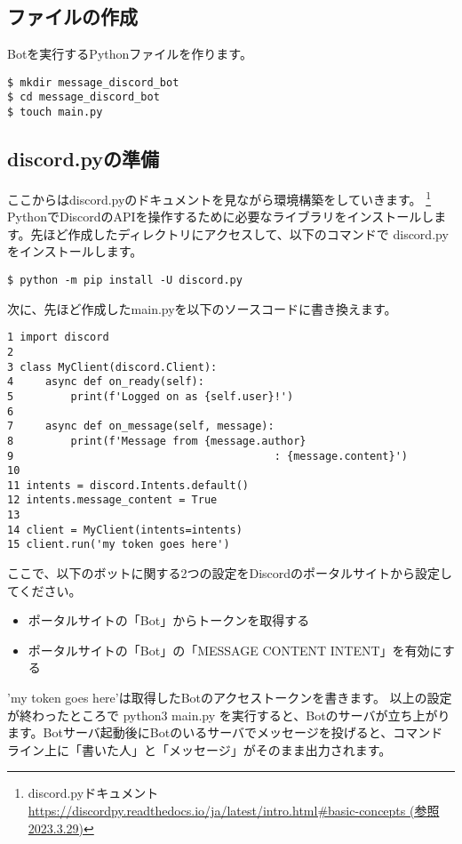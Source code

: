 \subsection{ファイルの作成}
Botを実行するPythonファイルを作ります。
\begin{shaded}
  \begin{verbatim}
$ mkdir message_discord_bot
$ cd message_discord_bot
$ touch main.py
\end{verbatim}
\end{shaded}

\subsection{discord.pyの準備}
ここからはdiscord.pyのドキュメントを見ながら環境構築をしていきます。
\footnote{discord.pyドキュメント\url{https://discordpy.readthedocs.io/ja/latest/intro.html\#basic-concepts (参照2023.3.29)}}
PythonでDiscordのAPIを操作するために必要なライブラリをインストールします。先ほど作成したディレクトリにアクセスして、以下のコマンドで discord.py をインストールします。
\begin{shaded}
  \begin{verbatim}
$ python -m pip install -U discord.py
\end{verbatim}
\end{shaded}
次に、先ほど作成したmain.pyを以下のソースコードに書き換えます。
\begin{tcolorbox}[breakable]
  \begin{verbatim}
1 import discord
2 
3 class MyClient(discord.Client):
4     async def on_ready(self):
5         print(f'Logged on as {self.user}!')
6 
7     async def on_message(self, message):
8         print(f'Message from {message.author}
9                                         : {message.content}')
10
11 intents = discord.Intents.default()
12 intents.message_content = True
13
14 client = MyClient(intents=intents)
15 client.run('my token goes here')
\end{verbatim}
\end{tcolorbox}
ここで、以下のボットに関する2つの設定をDiscordのポータルサイトから設定してください。
\begin{itemize}
  \item ポータルサイトの「Bot」からトークンを取得する
  \item ポータルサイトの「Bot」の「MESSAGE CONTENT INTENT」を有効にする
\end{itemize}
'my token goes here'は取得したBotのアクセストークンを書きます。
以上の設定が終わったところで python3 main.py を実行すると、Botのサーバが立ち上がります。Botサーバ起動後にBotのいるサーバでメッセージを投げると、コマンドライン上に「書いた人」と「メッセージ」がそのまま出力されます。

